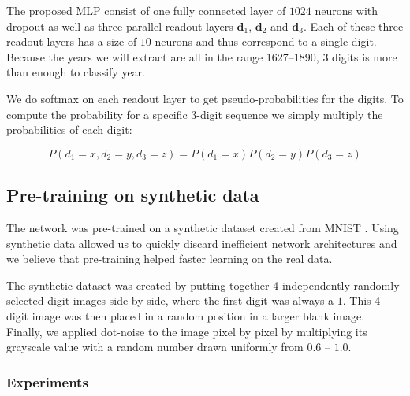 The proposed MLP consist of one fully connected layer of $1024$ neurons with dropout as well as three parallel readout layers $\mathbf{d}_1$, $\mathbf{d}_2$ and $\mathbf{d}_3$. Each of these three readout layers has a size of $10$ neurons and thus correspond to a single digit.
Because the years we will extract are all in the range 1627--1890, $3$ digits is more than enough to classify year.

We do softmax on each readout layer to get pseudo-probabilities for the digits.
To compute the probability for a specific 3-digit sequence we simply multiply the probabilities of each digit:

\[
P(d_1=x, d_2=y, d_3=z) = P(d_1=x) P(d_2=y) P(d_3=z)
\]



\subsection{Pre-training on synthetic data} \label{ssec:pretrain}
The network was pre-trained on a synthetic dataset created from MNIST \cite{MNIST_orig}. Using synthetic data allowed us to quickly discard inefficient network architectures and we believe that pre-training helped faster learning on the real data.

The synthetic dataset was created by putting together 4 independently randomly selected digit images side by side, where the first digit was always a $1$. This 4 digit image was then placed in a random position in a larger blank image. Finally, we applied dot-noise to the image pixel by pixel by multiplying its grayscale value with a random number drawn uniformly from $0.6$ -- $1.0$.


\subsubsection{Experiments}



